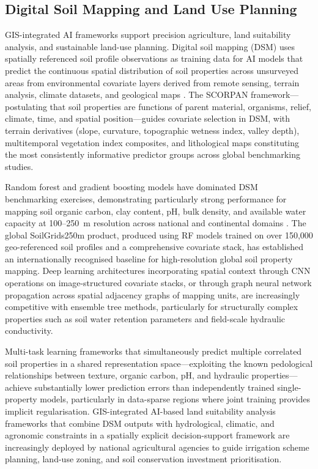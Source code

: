 \documentclass[land,article,submit,pdftex,moreauthors]{Definitions/mdpi}
\numberwithin{equation}{section}
\begin{document}
\subsection{Digital Soil Mapping and Land Use Planning}

GIS-integrated AI frameworks support precision agriculture, land suitability analysis, and sustainable land-use planning. Digital soil mapping (DSM) uses spatially referenced soil profile observations as training data for AI models that predict the continuous spatial distribution of soil properties across unsurveyed areas from environmental covariate layers derived from remote sensing, terrain analysis, climate datasets, and geological maps \citep{mcbratney2003digital}. The SCORPAN framework---postulating that soil properties are functions of parent material, organisms, relief, climate, time, and spatial position---guides covariate selection in DSM, with terrain derivatives (slope, curvature, topographic wetness index, valley depth), multitemporal vegetation index composites, and lithological maps constituting the most consistently informative predictor groups across global benchmarking studies.

Random forest and gradient boosting models have dominated DSM benchmarking exercises, demonstrating particularly strong performance for mapping soil organic carbon, clay content, pH, bulk density, and available water capacity at 100--250~m resolution across national and continental domains \citep{hengl2017soilgrids250m}. The global SoilGrids250m product, produced using RF models trained on over 150,000 geo-referenced soil profiles and a comprehensive covariate stack, has established an internationally recognised baseline for high-resolution global soil property mapping. Deep learning architectures incorporating spatial context through CNN operations on image-structured covariate stacks, or through graph neural network propagation across spatial adjacency graphs of mapping units, are increasingly competitive with ensemble tree methods, particularly for structurally complex properties such as soil water retention parameters and field-scale hydraulic conductivity.

Multi-task learning frameworks that simultaneously predict multiple correlated soil properties in a shared representation space---exploiting the known pedological relationships between texture, organic carbon, pH, and hydraulic properties---achieve substantially lower prediction errors than independently trained single-property models, particularly in data-sparse regions where joint training provides implicit regularisation. GIS-integrated AI-based land suitability analysis frameworks that combine DSM outputs with hydrological, climatic, and agronomic constraints in a spatially explicit decision-support framework are increasingly deployed by national agricultural agencies to guide irrigation scheme planning, land-use zoning, and soil conservation investment prioritisation.
\end{document}
